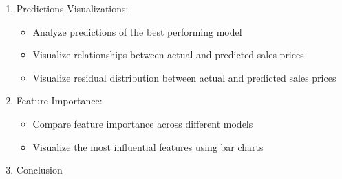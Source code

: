 \documentclass{article}
\begin{document}
\begin{enumerate}
\begin{itemize}
        \item Assess performance on test set
        \item Compare models using various metrics
        \item Analyze the improvement in using feature engineering for each of the three models
    \end{itemize}
    \item Predictions Visualizations:
    \begin{itemize}
        \item Analyze predictions of the best performing model
        \item Visualize relationships between actual and predicted sales prices
        \item Visualize residual distribution between actual and predicted sales prices
    \end{itemize}
    \item Feature Importance:
    \begin{itemize}
        \item Compare feature importance across different models
        \item Visualize the most influential features using bar charts
    \end{itemize}
    \item Conclusion
\end{enumerate}




\end{document}
